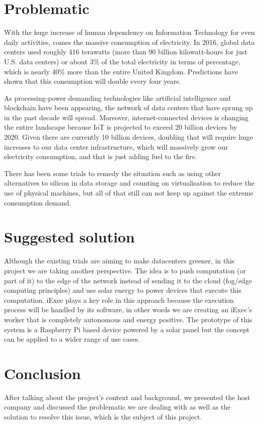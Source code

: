 \section{Problematic}
  With the huge increase of human dependency on Information Technology for even daily activities,
  comes the massive consumption of electricity. In 2016, global data centers used roughly 416
  terawatts (more than 90 billion kilowatt-hours for just U.S. data centers) or about 3\% of the
  total electricity in terms of percentage, which is nearly 40\% more than the entire United Kingdom.
  Predictions have shown that this consumption will double every four years\cite{consumption-prediction}.

  As processing-power demanding technologies like artificial intelligence and blockchain have
  been appearing, the network of data centers that have sprung up in the past decade will spread.
  Moreover, internet-connected devices is changing the entire landscape because IoT is
  projected to exceed 20 billion devices by 2020. Given there are currently 10 billion devices,
  doubling that will require huge increases to our data center infrastructure, which will
  massively grow our electricity consumption, and that is just adding fuel to the fire.

  There has been some trials to remedy the situation such as using other alternatives to silicon in
  data storage and counting on virtualisation to reduce the use of physical machines, but all of that
  still can not keep up against the extreme consumption demand.

\section{Suggested solution}
  Although the existing trials are aiming to make datacenters greener, in this project we are taking another
  perspective. The idea is to push computation (or part of it) to the edge of the network instead of sending
  it to the cloud (fog/edge computing principles) and use solar energy to power devices that execute this
  computation. iExec plays a key role in this approach because the execution process will be handled by its
  software, in other words we are creating an iExec's worker that is completely autonomous and energy positive.
  The prototype of this system is a Raspberry Pi based device powered by a solar panel but the concept can be
  applied to a wider range of use cases.

\section{Conclusion}
  After talking about the project's context and background, we presented the host company and discussed the
  problematic we are dealing with as well as the solution to resolve this issue, which is the subject of this
  project.

\clearpage
